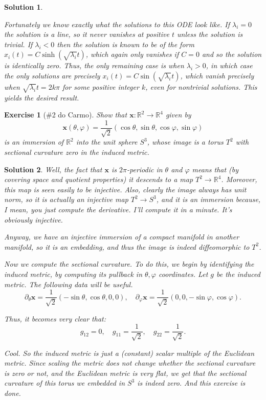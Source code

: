 \documentclass{article}
\theoremstyle{plain}
\newtheorem*{ex}{Exercise}
\theoremstyle{nonumberplain}
\newtheorem{sol}{Solution}
\newcommand{\R}{\mathbb{R}}
\newcommand{\mbf}[1]{\mathbf{#1}}
\begin{document}
\begin{sol}
\begin{enumerate}
Fortunately we know exactly what the solutions to this ODE look like. If $\lambda_i = 0$ the solution is a line, so it never vanishes at positive $t$ unless the solution is trivial. If $\lambda_i < 0$ then the solution is known to be of the form $x_i(t) = C \sinh(\sqrt{\lambda_i} t)$, which again only vanishes if $C = 0$ and so the solution is identically zero. Thus, the only remaining case is when $\lambda_i > 0$, in which case the only solutions are precisely $x_i(t) = C \sin(\sqrt{\lambda_i} t)$, which vanish precisely when $\sqrt{\lambda_i} t = 2 k \pi$ for some positive integer $k$, even for nontrivial solutions. This yields the desired result.
\end{enumerate}
\end{sol}

\begin{ex}[\#2 do Carmo]
Show that $\mbf x \colon \R^2 \to \R^4$ given by
\begin{equation}
\mbf x(\theta, \varphi) = \frac1{\sqrt2} (\cos \theta, \sin \theta, \cos \varphi, \sin\varphi)
\end{equation}
is an immersion of $\R^2$ into the unit sphere $S^3$, whose image is a torus $T^2$ with sectional curvature zero in the induced metric.
\end{ex}

\begin{sol}
Well, the fact that $\mbf x$ is $2\pi$-periodic in $\theta$ and $\varphi$ means that (by covering space and quotient properties) it descends to a map $T^2 \to \R^4$. Moreover, this map is seen easily to be injective. Also, clearly the image always has unit norm, so it is actually an injective map $T^2 \to S^3$, and it is an immersion because, I mean, you just compute the derivative. I'll compute it in a minute. It's obviously injective.

Anyway, we have an injective immersion of a compact manifold in another manifold, so it is an embedding, and thus the image is indeed diffeomorphic to $T^2$.

Now we compute the sectional curvature. To do this, we begin by identifying the induced metric, by computing its pullback in $\theta, \varphi$ coordinates. Let $g$ be the induced metric. The following data will be useful.
\begin{equation}
\partial_\theta \mbf x = \frac1{\sqrt 2}(-\sin \theta, \cos \theta, 0, 0), \quad \partial_\varphi \mbf x = \frac1{\sqrt 2} (0,0,-\sin \varphi, \cos \varphi).
\end{equation}

Thus, it becomes very clear that:
\begin{equation}
g_{12} = 0, \quad g_{11} = \frac1{\sqrt2}, \quad g_{22} = \frac1{\sqrt 2}.
\end{equation}

Cool. So the induced metric is just a (constant) scalar multiple of the Euclidean metric. Since scaling the metric does not change whether the sectional curvature is zero or not, and the Euclidean metric is very flat, we get that the sectional curvature of this torus we embedded in $S^3$ is indeed zero. And this exercise is done.
\end{sol}
\end{document}
